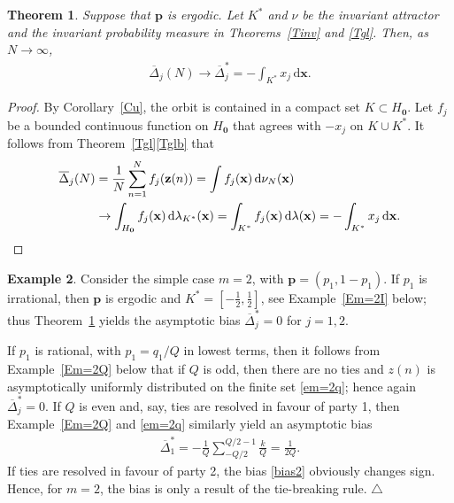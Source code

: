 \documentclass[11pt,reqno,tbtags,a4paper]{amsart}
\numberwithin{equation}{section}
\theoremstyle{plain}%
\newtheorem{theorem}{Theorem}[section]
\theoremstyle{definition}
\newcommand\xqed[1]{%
    \leavevmode\unskip\penalty9999 \hbox{}\nobreak\hfill
    \quad\hbox{#1}}
\newtheorem{exampleqqq}[theorem]{Example}
\newenvironment{example}{\begin{exampleqqq}}
  {\xqed{$\triangle$}\end{exampleqqq}}
\theoremstyle{remark}
\newcommand{\refT}[1]{Theorem~\ref{#1}}
\newcommand{\refTs}[1]{Theorems~\ref{#1}}
\newcommand{\refC}[1]{Corollary~\ref{#1}}
\newcommand{\refE}[1]{Example~\ref{#1}}
\newcommand\Ntoo{\ensuremath{{N\to\infty}}}
\newcommand\gD{\Delta}
\newcommand\gl{\lambda}
\newcommand\dd{\,\mathrm{d}}
\newcommand\Ho{H_{\0}}
\newcommand\vp{\mathbf{p}}
\newcommand\vx{\mathbf{x}}
\newcommand\vz{\mathbf{z}}
\newcommand\bgD{\overline{\gD}}
\newcommand\bgDx{\overline{\gD}^*}
\newcommand\Kx{K^*}
\newcommand\glKx{\gl_{\Kx}}
\newcommand\0{{\boldsymbol 0}}
\newcommand\1{{\boldsymbol 1}}
\begin{document}
\begin{theorem}\label{Tbias}
Suppose that $\vp$ is ergodic. Let $\Kx$ and $\nu$ be the invariant attractor 
and the invariant probability measure in \refTs{Tinv} and \ref{Tgl}.
Then, as \Ntoo,
\begin{align}\label{tbias}
  \bgD_j(N) \to \bgDx_j=-\int_{\Kx} x_j\dd\vx.
\end{align}
\end{theorem}
\begin{proof}
By \refC{Cu}, the orbit is contained in a compact set $K\subset\Ho$.
Let $f_j$ be a bounded continuous function on $\Ho$ that agrees with
$-x_j$ on $K\cup\Kx$. It follows from \refT{Tgl}\ref{Tglb} that
\begin{align}
  \bgD_j(N)&
=\frac{1}{N}\sum_{n=1}^N f_j(\vz(n))
=\int f_j(\vx)\dd\nu_N(\vx)
\notag\\&
\to \int_{\Ho}f_j(\vx)\dd\glKx(\vx)
=\int_{\Kx}f_j(\vx)\dd\gl(\vx)
=-\int_{\Kx}x_j\dd\vx.
\end{align}
\end{proof}


\begin{example}\label{Ebias2}
Consider the simple case $m=2$, with $\vp=(p_1,1-p_1)$.
If $p_1$ is irrational, then $\vp$ is ergodic and $\Kx=[-\frac12,\frac12]$, see
\refE{Em=2I} below; thus \refT{Tbias} yields the asymptotic bias $\bgDx_j=0$
for $j=1,2$.

If $p_1$ is rational, with $p_1=q_1/Q$ in lowest terms, then it follows from
\refE{Em=2Q} below that if $Q$ is odd, then there are no ties and 
$z(n)$ is asymptotically uniformly distributed on the finite set \eqref{em=2q};
hence again $\bgDx_j=0$. 
If $Q$ is even and, say, ties are resolved in favour of party 1,
then \refE{Em=2Q} and \eqref{em=2q} similarly yield an asymptotic bias
\begin{align}\label{bias2}
\bgDx_1=  -\frac{1}Q\sum_{-Q/2}^{Q/2-1}\frac{k}Q = \frac{1}{2Q}.
\end{align}
If ties are resolved in favour of party 2, the bias \eqref{bias2} obviously
changes sign. Hence, for $m=2$, the bias is only a result of the
tie-breaking rule.
\end{example}
\end{document}
